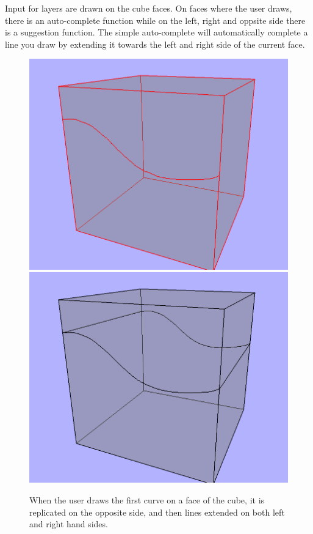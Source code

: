 \documentclass[a4paper,12pt]{report}
\begin{document}
Input for layers are drawn on the cube faces. On faces where the user draws, there is an auto-complete function while on the left, right and oppsite side there is a suggestion function. The simple auto-complete will automatically complete a line you draw by extending it towards the left and right side of the current face. 

\begin{figure}
\includegraphics[width=.5\linewidth]{thesis/suggestion1.png}
\includegraphics[width=.5\linewidth]{thesis/suggestion2.png}
 \caption{When the user draws the first curve on a face of the cube, it is replicated on the opposite side, and then lines extended on both left and right hand sides.}
 \label{fig:suggest}
\end{figure}
\end{document}
